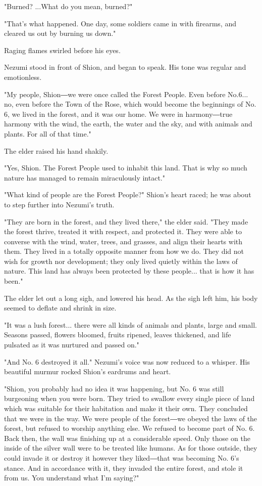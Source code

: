 "Burned? ...What do you mean, burned?"

"That's what happened. One day, some soldiers came in with firearms, and
cleared us out by burning us down."

Raging flames swirled before his eyes.


Nezumi stood in front of Shion, and began to speak. His tone was regular
and emotionless.

"My people, Shion―we were once called the Forest People. Even before
No.6... no, even before the Town of the Rose, which would become the
beginnings of No. 6, we lived in the forest, and it was our home. We
were in harmony―true harmony with the wind, the earth, the water and the
sky, and with animals and plants. For all of that time."

The elder raised his hand shakily.

"Yes, Shion. The Forest People used to inhabit this land. That is why so
much nature has managed to remain miraculously intact."

"What kind of people are the Forest People?" Shion's heart raced; he was
about to step further into Nezumi's truth.

"They are born in the forest, and they lived there," the elder said.
"They made the forest thrive, treated it with respect, and protected it.
They were able to converse with the wind, water, trees, and grasses, and
align their hearts with them. They lived in a totally opposite manner
from how we do. They did not wish for growth nor development; they only
lived quietly within the laws of nature. This land has always been
protected by these people... that is how it has been."

The elder let out a long sigh, and lowered his head. As the sigh left
him, his body seemed to deflate and shrink in size.

"It was a lush forest... there were all kinds of animals and plants,
large and small. Seasons passed, flowers bloomed, fruits ripened, leaves
thickened, and life pulsated as it was nurtured and passed on."

"And No. 6 destroyed it all." Nezumi's voice was now reduced to a
whisper. His beautiful murmur rocked Shion's eardrums and heart.

"Shion, you probably had no idea it was happening, but No. 6 was still
burgeoning when you were born. They tried to swallow every single piece
of land which was suitable for their habitation and make it their own.
They concluded that we were in the way. We were people of the forest―we
obeyed the laws of the forest, but refused to worship anything else. We
refused to become part of No. 6. Back then, the wall was finishing up at
a considerable speed. Only those on the inside of the silver wall were
to be treated like humans. As for those outside, they could invade it or
destroy it however they liked―that was becoming No. 6's stance. And in
accordance with it, they invaded the entire forest, and stole it from
us. You understand what I'm saying?"

